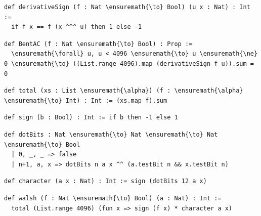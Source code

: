 \documentclass[11pt,a4paper]{article}
\begin{document}
\begin{Verbatim}[fontsize=\scriptsize,breaklines=true,breakanywhere=true,commandchars=\\\{\}]
def derivativeSign (f : Nat \ensuremath{\to} Bool) (u x : Nat) : Int :=
  if f x == f (x ^^^ u) then 1 else -1
\end{Verbatim}

\begin{Verbatim}[fontsize=\scriptsize,breaklines=true,breakanywhere=true,commandchars=\\\{\}]
def BentAC (f : Nat \ensuremath{\to} Bool) : Prop :=
  \ensuremath{\forall} u, u < 4096 \ensuremath{\to} u \ensuremath{\ne} 0 \ensuremath{\to} ((List.range 4096).map (derivativeSign f u)).sum = 0
\end{Verbatim}

\begin{Verbatim}[fontsize=\scriptsize,breaklines=true,breakanywhere=true,commandchars=\\\{\}]
def total (xs : List \ensuremath{\alpha}) (f : \ensuremath{\alpha} \ensuremath{\to} Int) : Int := (xs.map f).sum
\end{Verbatim}

\begin{Verbatim}[fontsize=\scriptsize,breaklines=true,breakanywhere=true,commandchars=\\\{\}]
def sign (b : Bool) : Int := if b then -1 else 1
\end{Verbatim}

\begin{Verbatim}[fontsize=\scriptsize,breaklines=true,breakanywhere=true,commandchars=\\\{\}]
def dotBits : Nat \ensuremath{\to} Nat \ensuremath{\to} Nat \ensuremath{\to} Bool
  | 0, _, _ => false
  | n+1, a, x => dotBits n a x ^^ (a.testBit n && x.testBit n)
\end{Verbatim}

\begin{Verbatim}[fontsize=\scriptsize,breaklines=true,breakanywhere=true,commandchars=\\\{\}]
def character (a x : Nat) : Int := sign (dotBits 12 a x)
\end{Verbatim}

\begin{Verbatim}[fontsize=\scriptsize,breaklines=true,breakanywhere=true,commandchars=\\\{\}]
def walsh (f : Nat \ensuremath{\to} Bool) (a : Nat) : Int :=
  total (List.range 4096) (fun x => sign (f x) * character a x)
\end{Verbatim}
\end{document}
